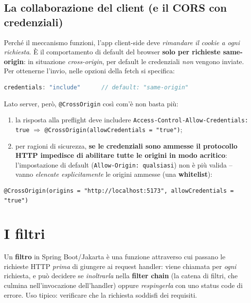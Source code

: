 \subsection{La collaborazione del client (e il CORS con credenziali)}
Perch\'e il meccanismo funzioni, l'app client-side deve \emph{rimandare il cookie a ogni
richiesta}. \`E il comportamento di default del browser \textbf{solo per richieste
same-origin}: in situazione \emph{cross-origin}, per default le credenziali \emph{non}
vengono inviate. Per ottenerne l'invio, nelle opzioni della fetch si specifica:
\begin{lstlisting}[language=JavaScript]
credentials: "include"      // default: "same-origin"
\end{lstlisting}
Lato server, per\`o, \texttt{@CrossOrigin} cos\`i com'\`e non basta pi\`u:
\begin{enumerate}
  \item la risposta alla preflight deve includere
        \texttt{Access-Control-Allow-Credentials: true} $\Rightarrow$
        \texttt{@CrossOrigin(allowCredentials = "true")};
  \item per ragioni di sicurezza, \textbf{se le credenziali sono ammesse il protocollo HTTP
        impedisce di abilitare tutte le origini in modo acritico}: l'impostazione di default
        (\texttt{Allow-Origin: qualsiasi}) non \`e pi\`u valida -- vanno \emph{elencate
        esplicitamente} le origini ammesse (una \textbf{whitelist}):
\end{enumerate}
\begin{lstlisting}[style=java]
@CrossOrigin(origins = "http://localhost:5173", allowCredentials = "true")
\end{lstlisting}

\section{I filtri}

\begin{definizione}[Filtro]
Un \textbf{filtro} in Spring Boot/Jakarta \`e una funzione attraverso cui passano le
richieste HTTP \emph{prima} di giungere ai request handler: viene chiamata per \emph{ogni}
richiesta, e pu\`o decidere se \emph{inoltrarla} nella \textbf{filter chain} (la catena di
filtri, che culmina nell'invocazione dell'handler) oppure \emph{respingerla} con uno status
code di errore. Uso tipico: verificare che la richiesta soddisfi dei requisiti.
\end{definizione}

